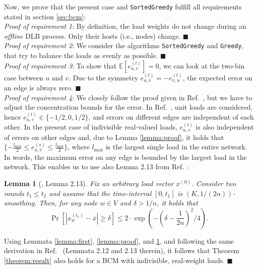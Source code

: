 \documentclass[12pt,psfig,a4]{article}
\newcommand{\sg}{\texttt{SortedGreedy}}
\newtheorem{mylemma}{Lemma}
\theoremstyle{plain}
\begin{document}
\medskip
Now, we prove that the present case and \sg{} fulfill all requirements stated in section \ref{sec:bcm}: \\
\textit{Proof of requirement 1}: By definition, the load weights do not change during an \textit{offline} DLB process. Only their hosts (i.e., nodes) change.  $\blacksquare$ \\
\textit{Proof of requirement 2}: We consider the algorithms \sg{} and \texttt{Greedy}, that try to balance the loads as evenly as possible. $\blacksquare$ \\
\textit{Proof of requirement 3}: To show that $\mathbb{E}[e_{u,v}^{(t)}]=0$, we can look at the two-bin case between $u$ and $v$. Due to the symmetry $e_{u,v}^{(t)}=-e_{v,u}^{(t)}$, the expected error on an edge is always zero. $\blacksquare$ \\
\textit{Proof of requirement 4}: We closely follow the proof given in Ref.~\cite{sauerwald2012tight}, but we have to adjust the concentration bounds for the error. In Ref.~\cite{sauerwald2012tight}, unit loads are considered, hence $e_{u,v}^{(t)} \in \{-1/2,0,1/2\}$, and errors on different edges are independent of each other. In the present case of indivisible real-valued loads, $e_{u,v}^{(t)}$ is also independent of errors on other edges and, due to Lemma \ref{lemma:proof}, it holds that $\{-\frac{l_{\max}}{2}\leq e_{u,v}^{(s)}\leq \frac{l_{\max}}{2}\}$, where $l_{\max}$ is the largest single load in the entire network. In words, the maximum error on any edge is bounded by the largest load in the network. This enables us to use also Lemma 2.13 from  Ref.~\cite{sauerwald2012tight}: 
\begin{mylemma}[\cite{sauerwald2012tight}, Lemma 2.13]
\label{lemma:final}
Fix an arbitrary load vector $x^{(0)}$. Consider two rounds $t_1\leq t_2$ and assume that the time-interval $[0,t_1]$ is $(K,1/(2n))$-smoothing. Then, for any node $w \in V$ and $\delta > 1/n$, it holds that
 	\begin{equation}
			\Pr\left [ \left | x_w^{(t_1)} - \bar{x} \right | \geq \delta \right ] \leq 2 \cdot \exp \left ( - \left ( \delta - \frac{1}{2n} \right )^{2}/4\right ).
	\end{equation} 

\end{mylemma}

Using Lemmata \ref{lemma:first}, \ref{lemma:proof}, and \ref{lemma:final}, and following the same derivation in Ref.~\cite{sauerwald2012tight} (Lemmata 2.12 and 2.13 therein), it follows that Theorem \ref{theorem:result} also holds for a BCM with indivisible, real-weight loads.  $\blacksquare$ \\
\end{document}
